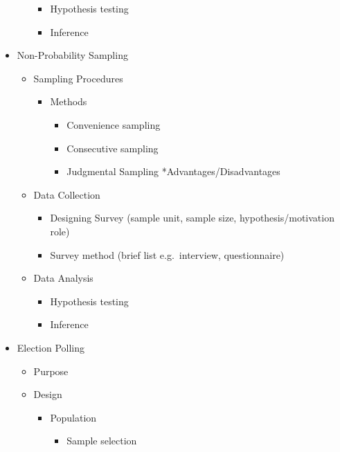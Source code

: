 \documentclass[12pt,twoside]{reedthesis}
\providecommand{\tightlist}{%
  \setlength{\itemsep}{0pt}\setlength{\parskip}{0pt}}
\begin{document}
\begin{itemize}
\begin{itemize}
    \begin{itemize}
    \tightlist
    \item
      Hypothesis testing
    \item
      Inference
    \end{itemize}
  \end{itemize}
\item
  Non-Probability Sampling
  \begin{itemize}
  \tightlist
  \item
    Sampling Procedures
    \begin{itemize}
    \tightlist
    \item
      Methods
      \begin{itemize}
      \tightlist
      \item
        Convenience sampling
      \item
        Consecutive sampling
      \item
        Judgmental Sampling
        *Advantages/Disadvantages
      \end{itemize}
    \end{itemize}
  \item
    Data Collection
    \begin{itemize}
    \tightlist
    \item
      Designing Survey (sample unit, sample size, hypothesis/motivation role)
    \item
      Survey method (brief list e.g.~interview, questionnaire)
    \end{itemize}
  \item
    Data Analysis
    \begin{itemize}
    \tightlist
    \item
      Hypothesis testing
    \item
      Inference
    \end{itemize}
  \end{itemize}
\item
  Election Polling
  \begin{itemize}
  \tightlist
  \item
    Purpose
  \item
    Design
    \begin{itemize}
    \tightlist
    \item
      Population
      \begin{itemize}
      \tightlist
      \item
        Sample selection
      \end{itemize}

\end{itemize}
\end{itemize}
\end{itemize}
\end{document}
